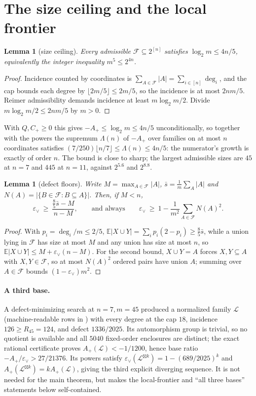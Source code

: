 \documentclass[11pt]{article}
\newtheorem{lemma}[theorem]{Lemma}
\theoremstyle{remark}
\newcommand{\F}{\mathcal F}
\newcommand{\eps}{\varepsilon}
\newcommand{\E}{\mathbb E}
\newcommand{\boxprod}{\mathbin{\boxtimes}}
\begin{document}
\section{The size ceiling and the local frontier}

\begin{lemma}[size ceiling]
\label{lem:ceiling}
Every admissible $\F\subseteq2^{[n]}$ satisfies $\log_2m\le4n/5$, equivalently
the integer inequality $m^5\le2^{4n}$.
\end{lemma}

\begin{proof}
Incidence counted by coordinates is $\sum_{A\in\F}|A|=\sum_{i\in[n]}\deg_i$,
and the cap bounds each degree by $\lfloor2m/5\rfloor\le2m/5$, so the incidence
is at most $2nm/5$.  Reimer admissibility demands incidence at least
$m\log_2m/2$.  Divide $m\log_2m/2\le2nm/5$ by $m>0$.
\end{proof}

With $Q,C_+\ge0$ this gives $-A_+\le\log_2m\le4n/5$ unconditionally, so together
with the powers the supremum $\Lambda(n)$ of $-A_+$ over families on at most $n$
coordinates satisfies $(7/250)\lfloor n/7\rfloor\le\Lambda(n)\le4n/5$: the
numerator's growth is exactly of order $n$.  The bound is close to sharp; the
largest admissible sizes are $45$ at $n=7$ and $445$ at $n=11$, against
$2^{5.6}$ and $2^{8.8}$.

\begin{lemma}[defect floors]
\label{lem:floors}
Write $M=\max_{A\in\F}|A|$, $\bar s=\frac1m\sum_A|A|$ and
$N(A)=|\{B\in\F:B\subseteq A\}|$.  Then, if $M<n$,
\[
  \eps_\vee\ \ge\ \frac{\tfrac85\bar s-M}{n-M},
  \qquad\text{and always}\qquad
  \eps_\vee\ \ge\ 1-\frac1{m^2}\sum_{A\in\F}N(A)^2 .
\]
\end{lemma}

\begin{proof}
With $p_i=\deg_i/m\le2/5$,
$\E|X\cup Y|=\sum_ip_i(2-p_i)\ge\tfrac85\bar s$, while a union lying in $\F$
has size at most $M$ and any union has size at most $n$, so
$\E|X\cup Y|\le M+\eps_\vee(n-M)$.  For the second bound, $X\cup Y=A$ forces
$X,Y\subseteq A$ with $X,Y\in\F$, so at most $N(A)^2$ ordered pairs have union
$A$; summing over $A\in\F$ bounds $(1-\eps_\vee)m^2$.
\end{proof}

\paragraph{A third base.}
A defect-minimizing search at $n=7,m=45$ produced a normalized family
$\mathcal L$ (machine-readable rows in
) with every degree at the
cap $18$, incidence $126\ge R_{45}=124$, and defect $1336/2025$.  Its
automorphism group is trivial, so no quotient is available and all $5040$
fixed-order enclosures are distinct; the exact rational certificate proves
$A_+(\mathcal L)<-1/1200$, hence base ratio
$-A_+/\eps_\vee>27/21376$.  Its powers satisfy
$\eps_\vee(\mathcal L^{\boxprod k})=1-(689/2025)^k$ and
$A_+(\mathcal L^{\boxprod k})=kA_+(\mathcal L)$, giving the third explicit
diverging sequence.  It is not needed for the main theorem, but makes the
local-frontier and ``all three bases'' statements below self-contained.
\end{document}

